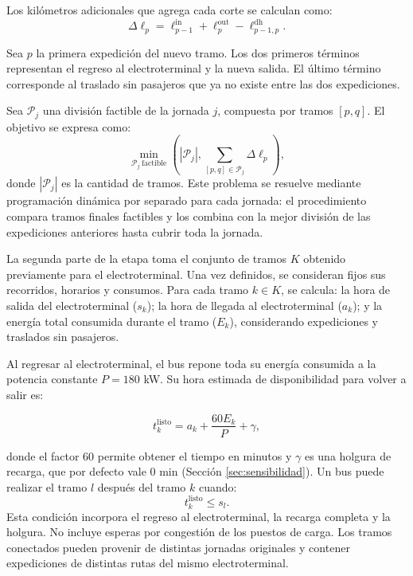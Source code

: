 Los kilómetros adicionales que agrega cada corte se calculan como:
\begin{equation}
\Delta\ell_p
=
\ell^{\mathrm{in}}_{p-1}
+
\ell^{\mathrm{out}}_p
-
\ell^{\mathrm{dh}}_{p-1,p}.
\label{eq:km_corte}
\end{equation}

Sea $p$ la primera expedición del nuevo tramo. Los dos primeros términos representan el regreso al electroterminal y la nueva salida. El último término corresponde al traslado sin pasajeros que ya no existe entre las dos expediciones.

Sea $\mathcal{P}_j$ una división factible de la jornada $j$,
compuesta por tramos $[p,q]$. El objetivo se expresa como:
\begin{equation}
\min_{\mathcal{P}_j\ \mathrm{factible}}
\left(
|\mathcal{P}_j|,
\sum_{[p,q]\in\mathcal{P}_j}\Delta\ell_p
\right),
\end{equation}
donde $|\mathcal{P}_j|$ es la cantidad de tramos. Este problema se resuelve mediante programación dinámica por separado para cada jornada: el procedimiento compara tramos finales factibles y los combina con la mejor división de las expediciones anteriores \cite[sección 6.3]{kleinberg2005} hasta cubrir toda la jornada.

La segunda parte de la etapa toma el conjunto de tramos $K$ obtenido previamente para el electroterminal. Una vez definidos, se consideran fijos sus recorridos, horarios y consumos. Para cada tramo $k\in K$, se calcula: la hora de salida del electroterminal ($s_k$); la hora de llegada al electroterminal ($a_k$); y la energía total consumida durante el tramo ($E_k$), considerando expediciones y traslados sin pasajeros.

Al regresar al electroterminal, el bus repone toda su energía consumida a la potencia constante $P = 180$ kW. Su hora estimada de disponibilidad para volver a salir es:

\begin{equation}
t_k^{\mathrm{listo}}
=
a_k+\frac{60E_k}{P}+\gamma,
\label{eq:disponibilidad_tramo}
\end{equation}

donde el factor 60 permite obtener el tiempo en minutos y $\gamma$ es una holgura de recarga, que por defecto vale 0 min (Sección \ref{sec:sensibilidad}). Un bus puede realizar el tramo $l$ después del tramo $k$ cuando:
\begin{equation}
t_k^{\mathrm{listo}}\leq s_l.
\label{eq:conexion_tramos}
\end{equation}
Esta condición incorpora el regreso al electroterminal,
la recarga completa y la holgura. No incluye
esperas por congestión de los puestos de carga.
Los tramos conectados pueden provenir de distintas
jornadas originales y contener expediciones de
distintas rutas del mismo electroterminal.

